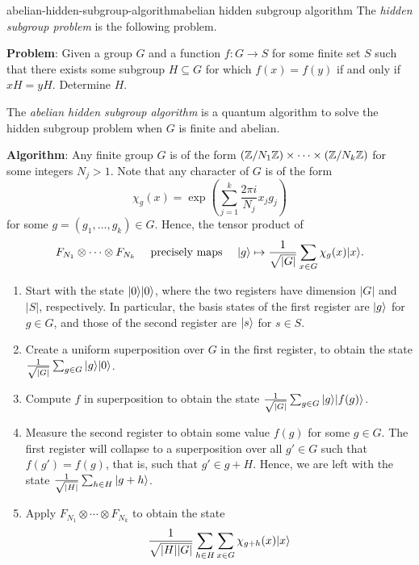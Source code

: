 \begin{topic}{abelian-hidden-subgroup-algorithm}{abelian hidden subgroup algorithm}
    The \textit{hidden subgroup problem} is the following problem.

    \textbf{Problem}: Given a group $G$ and a function $f \colon G \to S$ for some finite set $S$ such that there exists some subgroup $H \subseteq G$ for which $f(x) = f(y)$ if and only if $x H = y H$. Determine $H$.

    The \emph{abelian hidden subgroup algorithm} is a quantum algorithm to solve the hidden subgroup problem when $G$ is finite and abelian.

    \textbf{Algorithm}:
    Any finite group $G$ is of the form $(\mathbb{Z} / N_1 \mathbb{Z}) \times \cdots \times (\mathbb{Z} / N_k \mathbb{Z})$ for some integers $N_j > 1$.
    Note that any character of $G$ is of the form
    \[ \chi_g (x) = \exp \left( \textstyle\sum_{j = 1}^{k} \frac{2 \pi i}{N_j} x_j g_j \right) \]
    for some $g = (g_1, \ldots, g_k) \in G$.
    Hence, the tensor product of 
    \[ F_{N_1} \otimes \cdots \otimes F_{N_k} \quad \textup{ precisely maps } \quad |g\rangle \mapsto \frac{1}{\sqrt{|G|}} \sum_{x \in G} \chi_g(x) |x\rangle . \]
    \begin{enumerate}[label=(\arabic*)]
        \item Start with the state $|0\rangle |0\rangle$, where the two registers have dimension $|G|$ and $|S|$, respectively. In particular, the basis states of the first register are $|g\rangle$ for $g \in G$, and those of the second register are $|s\rangle$ for $s \in S$.
        \item Create a uniform superposition over $G$ in the first register, to obtain the state $\frac{1}{\sqrt{|G|}} \sum_{g \in G} |g\rangle |0\rangle$.
        \item Compute $f$ in superposition to obtain the state $\frac{1}{\sqrt{|G|}} \sum_{g \in G} |g\rangle |f(g)\rangle$.
        \item Measure the second register to obtain some value $f(g)$ for some $g \in G$. The first register will collapse to a superposition over all $g' \in G$ such that $f(g') = f(g)$, that is, such that $g' \in g + H$. Hence, we are left with the state $\frac{1}{\sqrt{|H|}} \sum_{h \in H} |g + h\rangle$.
        \item Apply $F_{N_1} \otimes \cdots \otimes F_{N_k}$ to obtain the state
        \[ \begin{aligned}
            \frac{1}{\sqrt{|H| |G|}} \sum_{h \in H} \sum_{x \in G} \chi_{g + h}(x) \ket{x}

\end{aligned}\]
\end{enumerate}
\end{topic}
